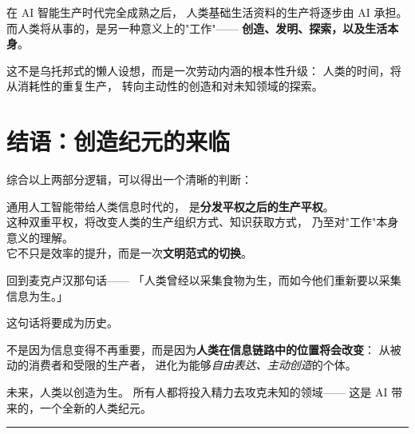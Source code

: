 \documentclass[12pt, a4paper, openany]{book}
\newcommand{\key}[1]{\textbf{\color{AccentBlue}#1}}
\newcommand{\emphasis}[1]{\textit{\color{AccentGold}#1}}
\begin{document}
\vspace{4pt}

在 AI 智能生产时代完全成熟之后，
人类基础生活资料的生产将逐步由 AI 承担。
而人类将从事的，是另一种意义上的"工作"——
\key{创造、发明、探索，以及生活本身}。

这不是乌托邦式的懒人设想，而是一次劳动内涵的根本性升级：
人类的时间，将从消耗性的重复生产，
转向主动性的创造和对未知领域的探索。

\section{结语：创造纪元的来临}

综合以上两部分逻辑，可以得出一个清晰的判断：

\begin{coreview}
通用人工智能带给人类信息时代的，
是\textbf{分发平权之后的生产平权}。\\[6pt]
这种双重平权，将改变人类的生产组织方式、知识获取方式，
乃至对"工作"本身意义的理解。\\[6pt]
它不只是效率的提升，而是一次\textbf{文明范式的切换}。
\end{coreview}

\vspace{10pt}

回到麦克卢汉那句话——
「人类曾经以采集食物为生，而如今他们重新要以采集信息为生。」

这句话将要成为历史。

不是因为信息变得不再重要，而是因为\key{人类在信息链路中的位置将会改变}：
从被动的消费者和受限的生产者，
进化为能够\emphasis{自由表达、主动创造}的个体。

未来，人类以创造为生。
所有人都将投入精力去攻克未知的领域——
这是 AI 带来的，一个全新的人类纪元。

\vspace{30pt}
\begin{center}
  \color{AccentBlue!30}\rule{6cm}{0.5pt}
\end{center}
\end{document}
